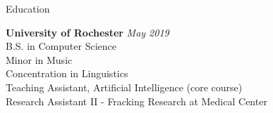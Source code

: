\documentclass{resume} %
\begin{document}

\begin{rSection}{Education}

\textbf{University of Rochester} \hfill \textit{May 2019} \\ 
B.S. in Computer Science \\
Minor in Music \\
Concentration in Linguistics \smallskip \\
Teaching Assistant, Artificial Intelligence (core course) \\
Research Assistant II - Fracking Research at Medical Center

\end{rSection}

\end{document}
